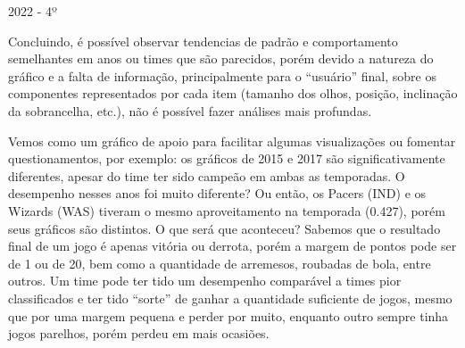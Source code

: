 \documentclass[
]{book}
\begin{document}
2022 - 4º

Concluindo, é possível observar tendencias de padrão e comportamento semelhantes em anos ou times que são parecidos, porém devido a natureza do gráfico e a falta de informação, principalmente para o ``usuário'' final, sobre os componentes representados por cada item (tamanho dos olhos, posição, inclinação da sobrancelha, etc.), não é possível fazer análises mais profundas.

Vemos como um gráfico de apoio para facilitar algumas visualizações ou fomentar questionamentos, por exemplo: os gráficos de 2015 e 2017 são significativamente diferentes, apesar do time ter sido campeão em ambas as temporadas. O desempenho nesses anos foi muito diferente? Ou então, os Pacers (IND) e os Wizards (WAS) tiveram o mesmo aproveitamento na temporada (0.427), porém seus gráficos são distintos. O que será que aconteceu? Sabemos que o resultado final de um jogo é apenas vitória ou derrota, porém a margem de pontos pode ser de 1 ou de 20, bem como a quantidade de arremesos, roubadas de bola, entre outros. Um time pode ter tido um desempenho comparável a times pior classificados e ter tido ``sorte'' de ganhar a quantidade suficiente de jogos, mesmo que por uma margem pequena e perder por muito, enquanto outro sempre tinha jogos parelhos, porém perdeu em mais ocasiões.

  
\end{document}
